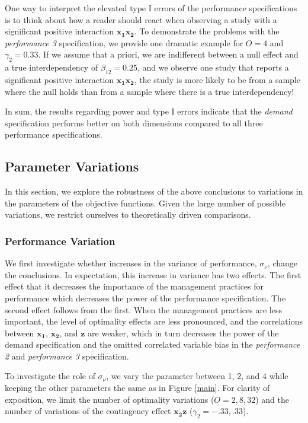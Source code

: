 \documentclass[12pt]{article}
\begin{document}
One way to interpret the elevated type I errors of the performance specifications is to think about how a reader should react when observing a study with a significant positive interaction \(\mathbf{x_1 x_2}\). To demonstrate the problems with the \emph{performance 3} specification, we provide one dramatic example for \(O = 4\) and \(\gamma_2 = 0.33\). If we assume that a priori, we are indifferent between a null effect and a true interdependency of \(\beta_{12} = 0.25\), and we observe one study that reports a significant positive interaction \(\mathbf{x_{1} x_{2}}\), the study is more likely to be from a sample where the null holds than from a sample where there is a true interdependency!

In sum, the results regarding power and type I errors indicate that the \emph{demand} specification performs better on both dimensions compared to all three performance specifications.

\subsection{Parameter Variations}\label{parameter-variations}

In this section, we explore the robustness of the above conclusions to variations in the parameters of the objective functions. Given the large number of possible variations, we restrict ourselves to theoretically driven comparisons.

\subsubsection{Performance Variation}\label{performance-variation}

We first investigate whether increases in the variance of performance, $\sigma_{\nu}$, change the conclusions. In expectation, this increase in variance has two effects. The first effect that it decreases the importance of the management practices for performance which decreases the power of the performance specification. The second effect follows from the first. When the management practices are less important, the level of optimality effects are less pronounced, and the correlations between $\mathbf{x_1}$, $\mathbf{x_2}$, and $\mathbf{z}$ are weaker, which in turn decreases the power of the demand specification and the omitted correlated variable bias in the \emph{performance 2} and \emph{performance 3} specification.

To investigate the role of $\sigma_{\nu}$, we vary the parameter between 1, 2, and 4 while keeping the other parameters the same as in Figure \ref{main}. For clarity of exposition, we limit the number of optimality variations ($O = 2, 8, 32$) and the number of variations of the contingency effect $\mathbf{x_2 z}$ ($\gamma_2 = -.33, .33$).
\end{document}
